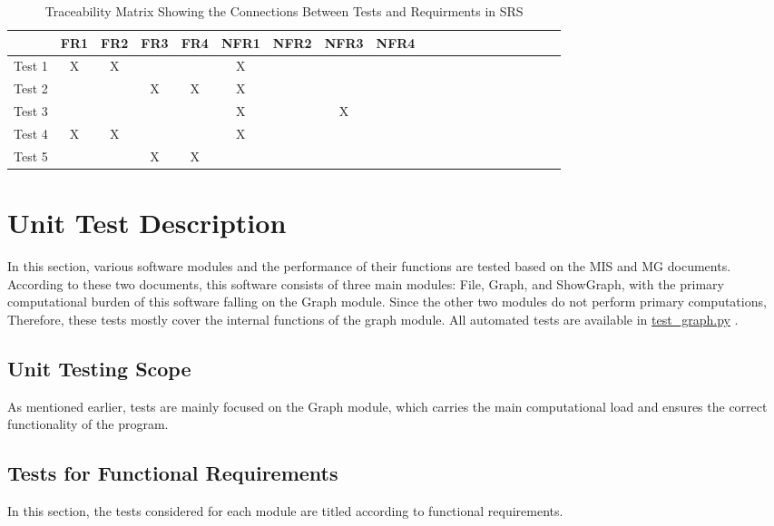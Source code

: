 \documentclass[12pt, titlepage]{article}
\begin{document}
\begin{table}[h!]
\centering
\begin{tabular}{|c|c|c|c|c|c|c|c|c|c|c|c|c|c|c|c|c|c|c|c|}
\hline
	&FR1 &FR2 & FR3 & FR4 &NFR1 &NFR2 & NFR3 & NFR4\\
\hline
Test 1     & X& X&  &  & X & & & \\ \hline
Test 2    & &   &  X&X  & X & & & \\ \hline
Test 3     &   &   &  &  & X & & X& \\ \hline
Test 4     &X  &X   &  &  & X & & & \\ \hline
Test 5    &  &  & X & X &  & & & \\ \hline

\end{tabular}
\caption{Traceability Matrix Showing the Connections Between Tests and Requirments in SRS}
\label{Table:A_trace}
\end{table}
\newpage
\section{Unit Test Description}

In this section, various software modules and the performance of their functions are tested based on the MIS and MG documents. According to these two documents, this software consists of three main modules: File, Graph, and ShowGraph, with the primary computational burden of this software falling on the Graph module. Since the other two modules do not perform primary computations, Therefore, these tests mostly cover the internal functions of the graph module. All automated tests are available in  \href{https://github.com/AtiyehSayadi/Centrality-In-Graphs/tree/main/test/test_graph.py}{test\_graph.py} .

\subsection{Unit Testing Scope}


As mentioned earlier, tests are mainly focused on the Graph module, which carries the main computational load and ensures the correct functionality of the program. 

\subsection{Tests for Functional Requirements}

In this section, the tests considered for each module are titled according to functional requirements.
\end{document}
